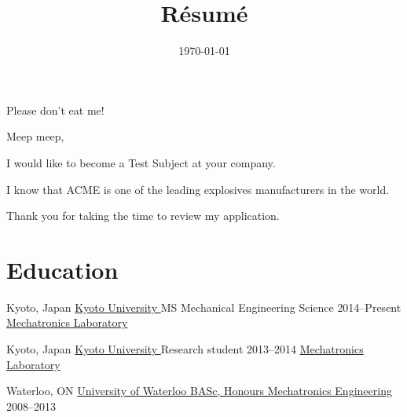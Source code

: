 \documentclass[10pt, letterpaper]{moderncv}
\title{Résumé}
\begin{document}
\date{\today}
\opening{Please don't eat me!}
\closing{Meep meep,}

\makelettertitle            %
    I would like to become a Test Subject at your company.

    I know that
        ACME
    is one of the leading explosives manufacturers in the world.




Thank you for taking the time to review my application.

\makeletterclosing          %
\newpage
\setcounter{page}{1}
\justifying


\makecvtitle
\vspace{-20pt}






\section{Education}
    \begin{samepage}
      \cventry
          {Kyoto, Japan}
          {\href{http://kyoto-u.ac.jp}{%
             Kyoto University%
}}
          {%
             MS Mechanical Engineering Science%
}
          {2014--Present}
          {%
\href{www.mechatronics.me.kyoto-u.ac.jp}{%
               Mechatronics Laboratory%
}%
%
          }
        {}
    \end{samepage}
    \begin{samepage}
      \cventry
          {Kyoto, Japan}
          {\href{http://kyoto-u.ac.jp}{%
             Kyoto University%
}}
          {%
             Research student%
}
          {2013--2014}
          {%
\href{www.mechatronics.me.kyoto-u.ac.jp}{%
               Mechatronics Laboratory%
}%
%
          }
        {}
    \end{samepage}
    \begin{samepage}
      \cventry
          {Waterloo, ON}
          {\href{http://www.uwaterloo.ca}{%
             University of Waterloo%
}}
          {\href{https://uwaterloo.ca/mechanical-mechatronics/engineering/program-overview}{%
             BASc, Honours Mechatronics Engineering%
}}
          {2008--2013}
          {%
          }
        {}
    \end{samepage}
\end{document}
